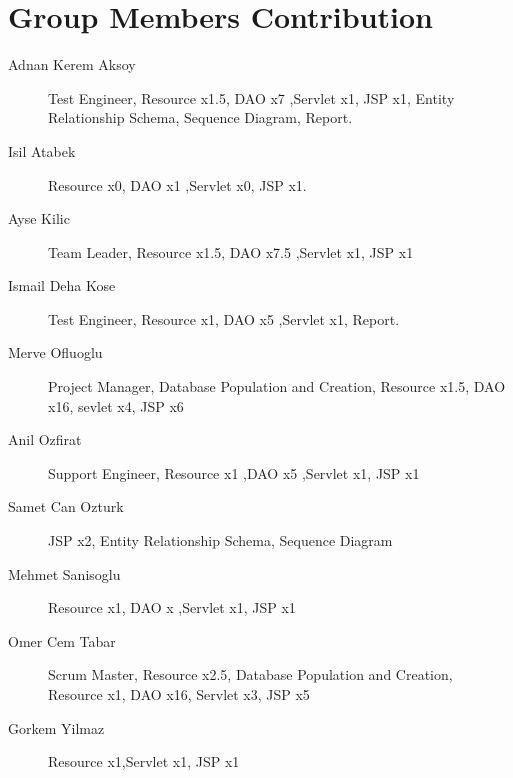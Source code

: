 \section{Group Members Contribution}


\begin{description}
	\item[Adnan Kerem Aksoy] Test Engineer, Resource x1.5, DAO x7 ,Servlet x1, JSP x1, Entity Relationship Schema, Sequence Diagram, Report.
	\item[Isil Atabek] Resource x0, DAO x1 ,Servlet x0, JSP x1.
	\item[Ayse Kilic] Team Leader, Resource x1.5, DAO x7.5 ,Servlet x1, JSP x1
	\item[Ismail Deha Kose] Test Engineer, Resource x1, DAO x5 ,Servlet x1, Report.
 	\item[Merve Ofluoglu] Project Manager, Database Population and Creation, Resource x1.5, DAO x16, sevlet x4, JSP x6
	\item[Anil Ozfirat] Support Engineer, Resource x1 ,DAO x5 ,Servlet x1, JSP x1
 	\item[Samet Can Ozturk] JSP x2, Entity Relationship Schema, Sequence Diagram
  	\item[Mehmet Sanisoglu] Resource x1, DAO x ,Servlet x1, JSP x1
   	\item[Omer Cem Tabar] Scrum Master, Resource x2.5, Database Population and Creation, Resource x1, DAO x16, Servlet x3, JSP x5
	\item[Gorkem Yilmaz] Resource x1,Servlet x1, JSP x1

\end{description}

